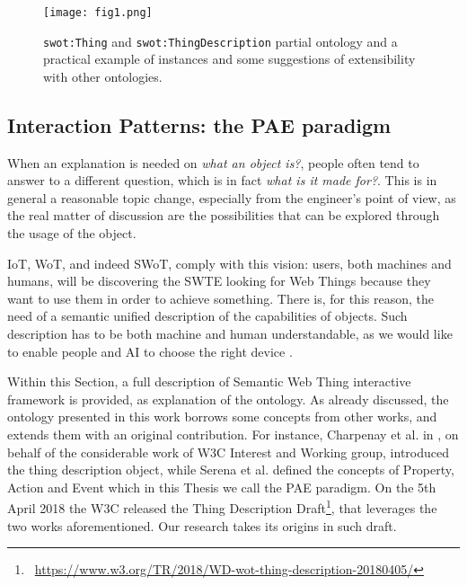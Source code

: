 \begin{figure*}[h]
\centering
\vspace{10pt}
\texttt{[image: fig1.png]}
\vspace{10pt}
\caption{\texttt{swot:Thing} and \texttt{swot:ThingDescription} partial ontology and a practical example of instances and some suggestions of extensibility with other ontologies.}
\label{fig:swot_fig1}
\end{figure*}

\subsection{Interaction Patterns: the PAE paradigm}
\label{ssec:interaction_patterns}
When an explanation is needed on \textit{what an object is?}, people often tend to answer to a different question, which is in fact \textit{what is it made for?}. This is in general a reasonable topic change, especially from the engineer's point of view, as the real matter of discussion are the possibilities that can be explored through the usage of the object.

IoT, WoT, and indeed SWoT, comply with this vision: users, both machines and humans, will be discovering the SWTE looking for Web Things because they want to use them in order to achieve something. There is, for this reason, the need of a semantic unified description of the capabilities of objects. Such description has to be both machine and human understandable, as we would like to enable people and AI to choose the right device \cite{hitzler2010reasonable}.

Within this Section, a full description of Semantic Web Thing interactive framework is provided, as explanation of the ontology. As already discussed, the ontology presented in this work borrows some concepts from other works, and extends them with an original contribution. For instance, Charpenay et al. in \cite{charpenay2016introducing}, on behalf of the considerable work of W3C Interest and Working group, introduced the thing description object, while Serena et al.\cite{serena2018discovery} defined the concepts of Property, Action and Event which in this Thesis we call the PAE paradigm. On the 5th April 2018 the W3C released the Thing Description Draft\footnote{\faLink~\url{https://www.w3.org/TR/2018/WD-wot-thing-description-20180405/}}, that leverages the two works aforementioned. Our research takes its origins in such draft.

